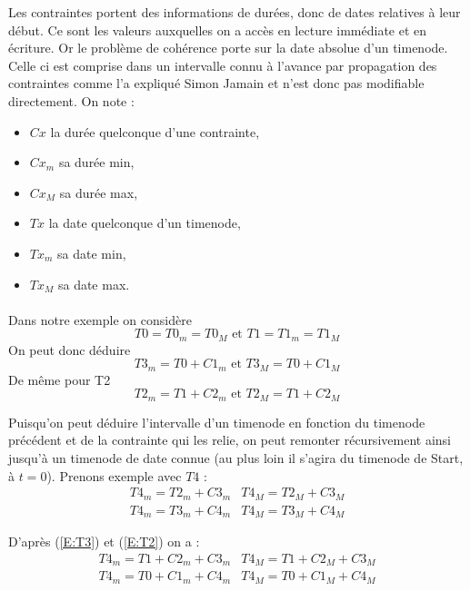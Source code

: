 \documentclass[10pt,a4paper]{article}
\begin{document}
Les contraintes portent des informations de durées, donc de dates relatives à leur début. Ce sont les valeurs auxquelles on a accès en lecture immédiate et en écriture. Or le problème de cohérence porte sur la date absolue d'un timenode. Celle ci est comprise dans un intervalle connu à l'avance par propagation des contraintes comme l'a expliqué Simon Jamain %
et n'est donc pas modifiable directement. On note : 
	\begin{itemize}
		\item $Cx$ la durée quelconque d'une contrainte,
		\item $Cx_m$ sa durée min,
		\item $Cx_M$ sa durée max,
		\item $Tx$ la date quelconque d'un timenode,
		\item $Tx_m$ sa date min,
		\item $Tx_M$ sa date max.
	\end{itemize}

\paragraph*{}
Dans notre exemple on considère \begin{equation} T0 = T0_m = T0_M \text{ et } T1 = T1_m = T1_M \end{equation}
On peut donc déduire \begin{equation}T3_m = T0 + C1_m \text{ et } T3_M = T0 + C1_M \label{E:T3}\end{equation}
De même pour T2 \begin{equation}T2_m = T1 + C2_m \text{ et } T2_M = T1 + C2_M \label{E:T2} \end{equation}

Puisqu'on peut déduire l'intervalle d'un timenode en fonction du timenode précédent et de la contrainte qui les relie, on peut remonter récursivement ainsi jusqu'à un timenode de date connue (au plus loin il s'agira du timenode de Start, à $t=0$). Prenons exemple avec $T4$ : 
	\begin{eqnarray} 
		\label{E:coherence}
		T4_m = T2_m + C3_m & T4_M = T2_M + C3_M \\
		T4_m = T3_m + C4_m & T4_M = T3_M + C4_M \nonumber
	\end{eqnarray}

D'après (\ref{E:T3}) et (\ref{E:T2}) on a :
	\begin{eqnarray} 
		\label{E:conjonction}
		T4_m = T1 + C2_m + C3_m &
		T4_M = T1 + C2_M + C3_M \\
		T4_m = T0 + C1_m + C4_m &
		T4_M = T0 + C1_M + C4_M \nonumber
	\end{eqnarray}
\end{document}
